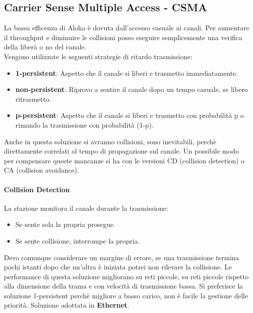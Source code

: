 \documentclass[12pt]{article}
\begin{document}
\subsection{Carrier Sense Multiple Access - CSMA}
La bassa efficenza di Aloha è dovuta dall'accesso casuale ai canali. Per aumentare il throughput e diminuire le collisioni posso eseguire semplicemente una verifica della liberà o no del canale.\\
Vengono utilizzate le seguenti strategie di ritardo trasmissione:
\begin{itemize}
  \item \textbf{1-persistent}: Aspetto che il canale si liberi e trasmetto immediatamente.
  \item \textbf{non-persistent}: Riprovo a sentire il canale dopo un tempo casuale, se libero ritrasmetto.
  \item \textbf{p-persistent}: Aspetto che il canale si liberi e trasmetto con probabilità p o rimando la trasmissione con probabilità (1-p).
\end{itemize}
Anche in questa soluzione si avranno collisioni, sono inevitabili, perchè direttamente correlati al tempo di propagazione sul canale. Un possibile modo per compensare queste mancanze si ha con le versioni CD (collision detection) o CA (collision avoidance).
\paragraph{Collision Detection}
La stazione monitora il canale durante la trasmissione:
\begin{itemize}
  \item Se sente sola la propria prosegue.
  \item Se sente collisione, interrompe la propria.
\end{itemize}
Devo comunque considerare un margine di errore, se una trasmissione termina pochi istanti dopo che un'altra è iniziata potrei non rilevare la collisione. Le performance di questa soluzione migliorano su reti piccole, su reti piccole rispetto alla dimensione della trama e con velocità di trasmissione bassa. Si preferisce la soluzione 1-persistent perchè migliore a basso carico, non è facile la gestione delle priorità. Soluzione adottata in \textbf{Ethernet}.
\end{document}
